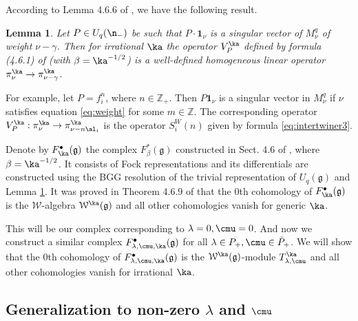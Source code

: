 \documentclass{amsart}
\newcommand{\+}{\mathop{\oplus}}
\renewcommand{\*}{{\otimes}}
\newcommand{\mc}{\mathcal}
\newcommand{\mf}{\mathfrak}
\newcommand{\g}{\mf{g}}
\newcommand{\Z}{\mathbb{Z}}
\newcommand{\lam}{\lambda}
\theoremstyle{theorem}
\newtheorem{Lem}[Th]{Lemma}
\theoremstyle{remark}
\numberwithin{equation}{section}
\begin{document}
According to Lemma 4.6.6 of \cite{FF93}, we have the following result.

\begin{Lem}    \label{linop}
  Let $P \in U_q(\n_-)$ be such that $P \cdot {\mathbf 1}_\nu$ is a
  singular vector of $M_\nu^q$ of weight $\nu-\gamma$. Then for
  irrational $\ka$ the operator $V_P^\ka$ defined by formula (4.6.1) of
  \cite{FF93} (with $\beta=\ka^{-1/2}$) is a well-defined homogeneous
  linear operator $\pi^\ka_\nu \to \pi^\ka_{\nu-\gamma}$.
\end{Lem}

For example, let $P=f_i^n$, where $n \in \Z_+$. Then $P {\mathbf 1}_\nu$
is a singular vector in $M^q_\nu$ if $\nu$ satisfies equation
\eqref{eq:weight} for some $m \in \Z$. The corresponding operator
$V_P^\ka: \pi^\ka_\nu \to \pi^\ka_{\nu-n\al_i}$ is the operator $S^W_i(n)$
given by formula \eqref{eq:intertwiner3}.

Denote by $F^\bullet_\ka(\g)$ the complex $F^*_\beta(\g)$ constructed
in Sect. 4.6 of \cite{FF93}, where $\beta=\ka^{-1/2}$. It consists of
Fock representations and its differentials are constructed using the
BGG resolution of the trivial representation of $U_q(\g)$ and Lemma
\ref{linop}. It was proved in Theorem 4.6.9 of \cite{FF93} that the
$0$th cohomology of $F^\bullet_\ka(\g)$ is the ${\mc W}$-algebra ${\mc
  W}^\ka(\g)$ and all other cohomologies vanish for generic $\ka$.

This will be our complex corresponding to $\lam=0, \cmu=0$. And now we
construct a similar complex $F^\bullet_{\lam,\cmu,\ka}(\g)$ for all
$\lam \in P_+, \cmu \in \check{P}_+$. We will show that the $0$th
cohomology of $F^\bullet_{\lam,\cmu,\ka}(\g)$ is the ${\mc
  W}^\ka(\g)$-module $T_{\lam,\cmu}^\ka$ and all other cohomologies
vanish for irrational $\ka$.

\subsection{Generalization to non-zero $\lam$ and $\cmu$}
\end{document}
